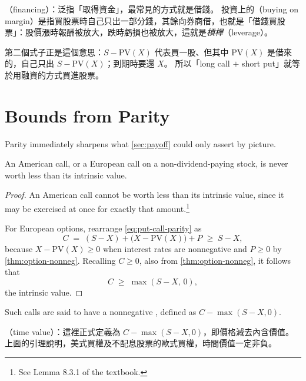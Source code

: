 \suppstart
\begin{remark}
	（financing）：泛指「取得資金」，最常見的方式就是借錢。
	投資上的（buying on margin）是指買股票時自己只出一部分錢，其餘向券商借，也就是「借錢買股票」：股價漲時報酬被放大，跌時虧損也被放大，這就是\emph{槓桿}（leverage）。

	第二個式子正是這個意思：$S-\mathrm{PV}(X)$ 代表買一股、但其中 $\mathrm{PV}(X)$ 是借來的，自己只出 $S-\mathrm{PV}(X)$；到期時要還 $X$。
	所以「long call $+$ short put」就等於用融資的方式買進股票。
\end{remark}
\suppend

\section{Bounds from Parity}
\label{sec:parity-bounds}


Parity immediately sharpens what \autoref{sec:payoff} could only assert by picture.

\begin{lemma}
	\label{lem:call-intrinsic}
	An American call, or a European call on a non-dividend-paying stock, is never worth less than its intrinsic value.
\end{lemma}

\begin{proof}
	An American call cannot be worth less than its intrinsic value, since it may be exercised at once for exactly that amount.\footnote{See Lemma 8.3.1 of the textbook.}

	For European options, rearrange \eqref{eq:put-call-parity} as
	\[
		C \;=\; (S-X) + \bigl(X-\mathrm{PV}(X)\bigr) + P \;\ge\; S-X ,
	\]
	because $X-\mathrm{PV}(X)\ge 0$ when interest rates are nonnegative and $P\ge 0$ by \autoref{thm:option-nonneg}.
	Recalling $C\ge 0$, also from \autoref{thm:option-nonneg}, it follows that
	\[
		C \;\ge\; \max(S-X,\,0) ,
	\]
	the intrinsic value.
\end{proof}

Such calls are said to have a nonnegative , defined as $C-\max(S-X,0)$.

\suppstart
\begin{remark}
	（time value）：這裡正式定義為 $C-\max(S-X,0)$，即價格減去內含價值。上面的引理說明，美式買權及不配息股票的歐式買權，時間價值一定非負。
\end{remark}
\suppend


